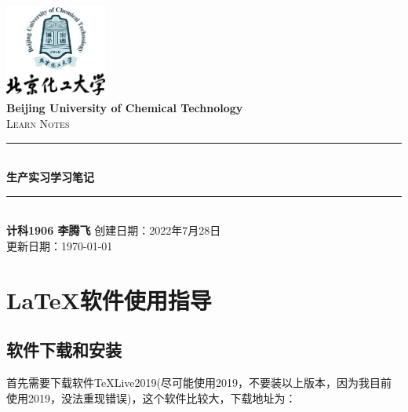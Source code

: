 \documentclass[cs4size,a4paper]{ctexart}
\numberwithin{equation}{section}
\numberwithin{table}{section}
\numberwithin{figure}{section}
\newcommand{\HRule}{\rule{\linewidth}{0.5mm}}
\begin{document}
\newtheorem{example}{例}              	%
\newtheorem{algorithem}{算法}	
\newtheorem{theorem}{定理}            	%
\newtheorem{definition}{定义}
\newtheorem{axiom}{公理}
\newtheorem{property}{性质}
\newtheorem{proposition}{命题}
\newtheorem{lemma}{引理}
\newtheorem{corollary}{推论}
\newtheorem{remark}{注解}
\newtheorem{condition}{条件}
\newtheorem{conclusion}{结论}
\newtheorem{assumption}{假设}
\renewcommand{\contentsname}{目录}     
\renewcommand{\abstractname}{摘要} 
\renewcommand{\refname}{参考文献}     
\renewcommand{\indexname}{索引}
\renewcommand{\figurename}{图}
\renewcommand{\tablename}{表}
\renewcommand{\appendixname}{附录}
\renewcommand{\proofname}{证明}
\renewcommand\emph[1]{\textcolor{red}{\textbf{#1}}}
\begin{titlepage}
\begin{center}
\includegraphics[width=0.25\textwidth]{logo}\\[1cm]    
\textsf{\Large\bfseries Beijing University of Chemical Technology}\\[1.0cm]
\textsc{\Large Learn Notes}\\[0.5cm]
\HRule \\[0.8cm]
{\huge \bfseries 生产实习学习笔记}\\[0.4cm]
\HRule \\[0.7cm]
\textsf{\bfseries 计科1906 李腾飞}
\tableofcontents 
\vfill
{创建日期：2022年7月28日}\\
{更新日期：\today}
\end{center}
\end{titlepage}
\pagestyle{plain}
\thispagestyle{empty}
\pagestyle{fancy}

\section{LaTeX软件使用指导}
\subsection{软件下载和安装}
首先需要下载软件TeXLive2019(尽可能使用2019，不要装以上版本，因为我目前使用2019，没法重现错误)，这个软件比较大，下载地址为：
\end{document}
